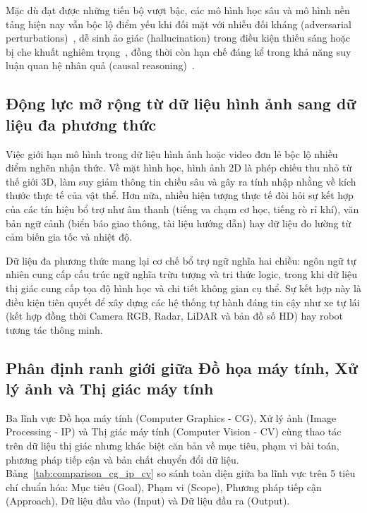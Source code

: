 Mặc dù đạt được những tiến bộ vượt bậc, các mô hình học sâu và mô hình nền tảng hiện nay vẫn bộc lộ điểm yếu khi đối mặt với nhiễu đối kháng (adversarial perturbations)~\citep{li2024adversarial}, dễ sinh ảo giác (hallucination) trong điều kiện thiếu sáng hoặc bị che khuất nghiêm trọng~\citep{hendrycks2019benchmarking,li2023evaluating,guan2024hallusionbench}, đồng thời còn hạn chế đáng kể trong khả năng suy luận quan hệ nhân quả (causal reasoning)~\citep{zang2023discovering}.

\subsection{Động lực mở rộng từ dữ liệu hình ảnh sang dữ liệu đa phương thức}

Việc giới hạn mô hình trong dữ liệu hình ảnh hoặc video đơn lẻ bộc lộ nhiều điểm nghẽn nhận thức. Về mặt hình học, hình ảnh 2D là phép chiếu thu nhỏ từ thế giới 3D, làm suy giảm thông tin chiều sâu và gây ra tính nhập nhằng về kích thước thực tế của vật thể. Hơn nữa, nhiều hiện tượng thực tế đòi hỏi sự kết hợp của các tín hiệu bổ trợ như âm thanh (tiếng va chạm cơ học, tiếng rò rỉ khí), văn bản ngữ cảnh (biển báo giao thông, tài liệu hướng dẫn) hay dữ liệu đo lường từ cảm biến gia tốc và nhiệt độ.

Dữ liệu đa phương thức mang lại cơ chế bổ trợ ngữ nghĩa hai chiều: ngôn ngữ tự nhiên cung cấp cấu trúc ngữ nghĩa trừu tượng và tri thức logic, trong khi dữ liệu thị giác cung cấp tọa độ hình học và chi tiết không gian cụ thể. Sự kết hợp này là điều kiện tiên quyết để xây dựng các hệ thống tự hành đáng tin cậy như xe tự lái (kết hợp đồng thời Camera RGB, Radar, LiDAR và bản đồ số HD) hay robot tương tác thông minh.

\subsection{Phân định ranh giới giữa Đồ họa máy tính, Xử lý ảnh và Thị giác máy tính}

Ba lĩnh vực Đồ họa máy tính (Computer Graphics - CG), Xử lý ảnh (Image Processing - IP) và Thị giác máy tính (Computer Vision - CV) cùng thao tác trên dữ liệu thị giác nhưng khác biệt căn bản về mục tiêu, phạm vi bài toán, phương pháp tiếp cận và bản chất chuyển đổi dữ liệu. Bảng~\ref{tab:comparison_cg_ip_cv} so sánh toàn diện giữa ba lĩnh vực trên 5 tiêu chí chuẩn hóa: Mục tiêu (Goal), Phạm vi (Scope), Phương pháp tiếp cận (Approach), Dữ liệu đầu vào (Input) và Dữ liệu đầu ra (Output).

